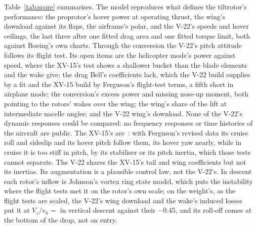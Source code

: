 \documentclass[10pt,a4paper,twocolumn]{article}
\begin{document}
Table~\ref{tab:score} summarises. The model reproduces what defines the tiltrotor's performance: the proprotor's hover power at operating thrust, the
wing's download against its flaps, the airframe's polar, and the V-22's speeds and hover ceilings, the last three after one fitted drag area and one
fitted torque limit, both against Boeing's own charts. Through the conversion the V-22's pitch attitude follows its flight test. Its open items are the
helicopter mode's power against speed, where the XV-15's test shows a shallower bucket than the blade elements and the wake give; the drag Bell's
coefficients lack, which the V-22 build supplies by a fit and the XV-15 build by Ferguson's flight-test terms, a fifth short in airplane mode; the
conversion's excess power and missing nose-up moment, both pointing to the rotors' wakes over the wing; the wing's share of the lift at intermediate
nacelle angles; and
the V-22 wing's download. None of the V-22's dynamic responses could be compared: no frequency responses or time histories of the aircraft are public. The
XV-15's are~\cite{tt}: with Ferguson's revised data its cruise roll and sideslip and its hover pitch follow them, its hover yaw nearly, while in cruise it
is too stiff in pitch, by its stabiliser or its pitch inertia, which those tests cannot separate. The V-22 shares the XV-15's tail and wing coefficients but not its inertias.
Its augmentation is a plausible control law, not the V-22's. In descent each rotor's inflow is Johnson's vortex ring state model, which
puts the instability where the flight tests met it on the rotor's own scale; on the weight's, as the flight tests are scaled, the V-22's wing
download and the wake's induced losses put it at $V_z/v_h={}$\NVrsLoW{} in vertical descent against their $-0.45$, and its roll-off comes at the
bottom of the drop, not on entry.

\end{document}
